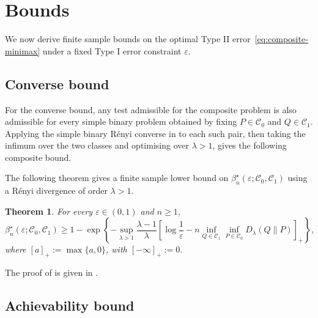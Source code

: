 \documentclass[journal,10pt,draftclsnofoot,onecolumn]{IEEEtran}
\newtheorem{theorem}{Theorem}
\begin{document}
\section{Bounds}
\label{sec:finite-blocklength-bounds}

We now derive finite sample bounds on the optimal Type II error~\eqref{eq:composite-minimax} under a fixed Type I error constraint $\varepsilon$. 

\subsection{Converse bound}
\label{sec:composite-converse}

For the converse bound, any test admissible for the composite problem is also admissible for every simple binary problem obtained by fixing $P\in\mathcal C_0$ and $Q\in\mathcal C_1$. Applying the simple binary R\'enyi converse in \cite[Thm.~1]{bruno2026finite} to each such pair, then taking the infimum over the two classes and optimising over $\lambda>1$, gives the following composite bound.

The following theorem gives a finite sample lower bound on $\beta_n^\star(\varepsilon;\mathcal C_0,\mathcal C_1)$ using a R\'enyi divergence of order $\lambda>1$.

\begin{theorem}
\label{thm:finite-blocklength-composite-renyi-converse}
For every $\varepsilon\in(0,1)$ and $n\geq1$,
\begin{equation}
\beta_n^\star(\varepsilon;\mathcal C_0,\mathcal C_1) \geq 1- \exp\left\{-\sup_{\lambda>1} \frac{\lambda-1}{\lambda} \left[\log\frac{1}{\varepsilon} -n\inf_{Q\in\mathcal C_1}\inf_{P\in\mathcal C_0}D_\lambda(Q\|P) \right]_+ \right\},
\label{eq:finite-blocklength-composite-renyi-converse}
\end{equation}
where $[a]_+:=\max\{a,0\}$, with $[-\infty]_+:=0$.
\end{theorem}

The proof of 
is given in .


\subsection{Achievability bound}
\label{sec:composite-achievability}
\end{document}
